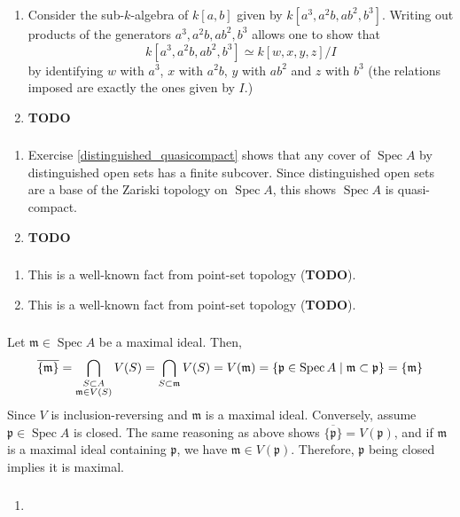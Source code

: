\documentclass{article}
\DeclareMathOperator{\Spec}{Spec}
\newcommand{\todo}{\textbf{TODO}}
\newcommand{\m}{\mathfrak{m}}
\newcommand{\p}{\mathfrak{p}}
\newcommand{\exercise}{\subsubsection} %
\begin{document}
\exercise{} \begin{enumerate}
    \item Consider the sub-$k$-algebra of $k[a,b]$ given by $k[a^3,a^2 b,ab^2, b^3]$. Writing out products of the generators $a^3,a^2 b, ab^2, b^3$ allows one to show that
    \[k[a^3,a^2 b,ab^2, b^3]\simeq k[w,x,y,z]/I\]
    by identifying $w$ with $a^3$, $x$ with $a^2b$, $y$ with $ab^2$ and $z$ with $b^3$ (the relations imposed are exactly the ones given by $I$.)
    \item \todo
\end{enumerate}

\exercise{} \begin{enumerate}
    \item Exercise \ref{distinguished_quasicompact} shows that any cover of $\Spec A$ by distinguished open sets has a finite subcover. Since distinguished open sets are a base of the Zariski topology on $\Spec A$, this shows $\Spec A$ is quasi-compact.
    \item \todo
\end{enumerate}

\exercise{} \begin{enumerate}
    \item This is a well-known fact from point-set topology (\todo).
    \item This is a well-known fact from point-set topology (\todo).
\end{enumerate}

\exercise{} Let $\m \in \Spec A$ be a maximal ideal. Then,
\[\overline{\{\m\}} = \bigcap_{\begin{subarray}{c} S \subset A \\ \m \in V(S) \end{subarray} } V(S) = \bigcap_{S \subset \m} V(S) = V(\m) = \{\p \in \Spec A \mid \m \subset \p\} = \{\m\}\]
Since $V$ is inclusion-reversing and $\m$ is a maximal ideal. Conversely, assume $\p \in \Spec A$ is closed. The same reasoning as above shows $\overline{\{\p\}} = V(\p)$, and if $\m$ is a maximal ideal containing $\p$, we have $\m \in V(\p)$. Therefore, $\p$ being closed implies it is maximal.

\exercise{} \begin{enumerate}
    \item 
\end{enumerate}
\end{document}
